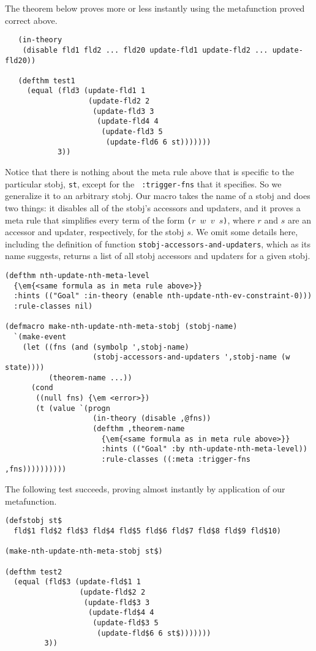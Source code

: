 \noindent The theorem below proves more or less instantly using the
metafunction proved correct above.

\begin{verbatim}
   (in-theory
    (disable fld1 fld2 ... fld20 update-fld1 update-fld2 ... update-fld20))

   (defthm test1
     (equal (fld3 (update-fld1 1
                   (update-fld2 2
                    (update-fld3 3
                     (update-fld4 4
                      (update-fld3 5
                       (update-fld6 6 st)))))))
            3))
\end{verbatim}

Notice that there is nothing about the meta rule above that is
specific to the particular stobj, {\tt st}, except for the {\tt
  :trigger-fns} that it specifies.  So we generalize it to an
arbitrary stobj.  Our macro takes the name of a stobj and does two
things: it disables all of the stobj's accessors and updaters, and it
proves a meta rule that simplifies every term of the form {\tt ($r$
  $w$ $v$ $s$)}, where $r$ and $s$ are an accessor and updater,
respectively, for the stobj $s$.  We omit some details here, including
the definition of function {\tt stobj-accessors-and-updaters}, which
as its name suggests, returns a list of all stobj accessors and
updaters for a given stobj.

\begin{Verbatim}[commandchars=\\\{\},fontsize=\small]
(defthm nth-update-nth-meta-level
  {\em{<same formula as in meta rule above>}}
  :hints (("Goal" :in-theory (enable nth-update-nth-ev-constraint-0)))
  :rule-classes nil)

(defmacro make-nth-update-nth-meta-stobj (stobj-name)
  `(make-event
    (let ((fns (and (symbolp ',stobj-name)
                    (stobj-accessors-and-updaters ',stobj-name (w state))))
          (theorem-name ...))
      (cond
       ((null fns) {\em <error>})
       (t (value `(progn
                    (in-theory (disable ,@fns))
                    (defthm ,theorem-name
                      {\em{<same formula as in meta rule above>}}
                      :hints (("Goal" :by nth-update-nth-meta-level))
                      :rule-classes ((:meta :trigger-fns ,fns))))))))))
\end{Verbatim}

The following test succeeds, proving almost instantly by application
of our metafunction.

\begin{verbatim}
(defstobj st$
  fld$1 fld$2 fld$3 fld$4 fld$5 fld$6 fld$7 fld$8 fld$9 fld$10)

(make-nth-update-nth-meta-stobj st$)

(defthm test2
  (equal (fld$3 (update-fld$1 1
                 (update-fld$2 2
                  (update-fld$3 3
                   (update-fld$4 4
                    (update-fld$3 5
                     (update-fld$6 6 st$)))))))
         3))
\end{verbatim}


